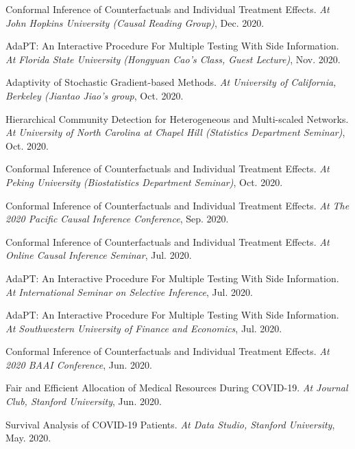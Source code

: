 \documentclass{article}
\begin{document}
\vspace{2mm}
Conformal Inference of Counterfactuals and Individual Treatment Effects. \emph{At John Hopkins University (Causal Reading Group)}, Dec. 2020.

\vspace{2mm}
AdaPT: An Interactive Procedure For Multiple Testing With Side Information. \emph{At Florida State University (Hongyuan Cao's Class, Guest Lecture)}, Nov. 2020. 

\vspace{2mm}
Adaptivity of Stochastic Gradient-based Methods. \emph{At University of California, Berkeley (Jiantao Jiao's group}, Oct. 2020. 

\vspace{2mm}
Hierarchical Community Detection for Heterogeneous and Multi-scaled Networks. \emph{At University of North Carolina at Chapel Hill (Statistics Department Seminar)}, Oct. 2020. 

\vspace{2mm}
Conformal Inference of Counterfactuals and Individual Treatment Effects. \emph{At Peking University (Biostatistics Department Seminar)}, Oct. 2020.

\vspace{2mm}
Conformal Inference of Counterfactuals and Individual Treatment Effects. \emph{At The 2020 Pacific Causal Inference Conference}, Sep. 2020.

\vspace{2mm}
Conformal Inference of Counterfactuals and Individual Treatment Effects. \emph{At Online Causal Inference Seminar}, Jul. 2020.

\vspace{2mm}
AdaPT: An Interactive Procedure For Multiple Testing With Side Information. \emph{At International Seminar on Selective Inference}, Jul. 2020. 

\vspace{2mm}
AdaPT: An Interactive Procedure For Multiple Testing With Side Information. \emph{At Southwestern University of Finance and Economics}, Jul. 2020. 

\vspace{2mm}
Conformal Inference of Counterfactuals and Individual Treatment Effects. \emph{At 2020 BAAI Conference}, Jun. 2020. 

\vspace{2mm}
Fair and Efficient Allocation of Medical Resources During COVID-19. \emph{At Journal Club, Stanford University}, Jun. 2020.

\vspace{2mm}
Survival Analysis of COVID-19 Patients. \emph{At Data Studio, Stanford University}, May. 2020.
\end{document}
